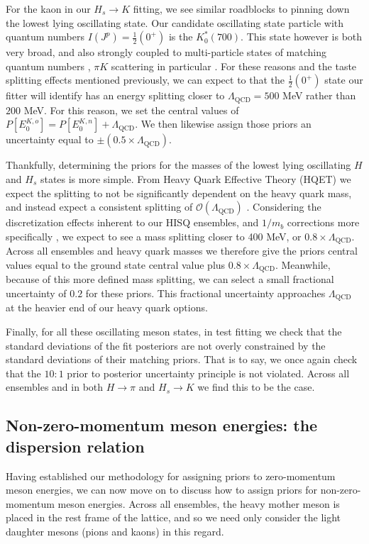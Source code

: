 For the kaon in our $H_s\rightarrow K$ fitting, we see similar roadblocks to pinning down the lowest lying oscillating state.  Our candidate oscillating state particle with quantum numbers $I(J^p) = \frac{1}{2}(0^+)$ is the $K^*_0(700)$.  This state however is both very broad, and also strongly coupled to multi-particle states of matching quantum numbers \cite{PhysRevD.91.054008}, $\pi K$ scattering in particular \cite{PhysRevD.102.114520}.  For these reasons and the taste splitting effects mentioned previously, we can expect to that the $\frac{1}{2}(0^+)$ state our fitter will identify has an energy splitting closer to $\Lambda_\mathrm{QCD} = 500$ MeV rather than $200$ MeV.  For this reason, we set the central values of $P[E_0^{K,o}] = P[E_0^{K,n}] + \Lambda_\mathrm{QCD}$.  We then likewise assign those priors an uncertainty equal to $\pm (0.5\times \Lambda_\mathrm{QCD})$.

Thankfully, determining the priors for the masses of the lowest lying oscillating $H$ and $H_s$ states is more simple. From Heavy Quark Effective Theory (HQET) we expect the splitting to not be significantly dependent on the heavy quark mass, and instead expect a consistent splitting of $\mathcal{O}(\Lambda_\mathrm{QCD})$ \cite{Neubert:1994, Gandhi:2022epjc}.  Considering the discretization effects inherent to our HISQ ensembles, and $1/m_b$ corrections more specifically \cite{LANG201517}, we expect to see a mass splitting closer to 400 MeV, or $0.8\times\Lambda_\mathrm{QCD}$\cite{PhysRevD.70.054501}.  Across all ensembles and heavy quark masses we therefore give the priors central values equal to the ground state central value plus $0.8\times\Lambda_\mathrm{QCD}$.  Meanwhile, because of this more defined mass splitting, we can select a small fractional uncertainty of $0.2$ for these priors. This fractional uncertainty approaches $\Lambda_\mathrm{QCD}$ at the heavier end of our heavy quark options.

Finally, for all these oscillating meson states, in test fitting we check that the standard deviations of the fit posteriors are not overly constrained by the standard deviations of their matching priors. That is to say, we once again check that the $10:1$ prior to posterior uncertainty principle is not violated.  Across all ensembles and in both $H\rightarrow\pi$ and $H_s\rightarrow K$ we find this to be the case.

\subsection{Non-zero-momentum meson energies: the dispersion relation}\label{sec:dispertion_relation}
Having established our methodology for assigning priors to zero-momentum meson energies, we can now move on to discuss how to assign priors for non-zero-momentum meson energies.  Across all ensembles, the heavy mother meson is placed in the rest frame of the lattice, and so we need only consider the light daughter mesons (pions and kaons) in this regard.  

